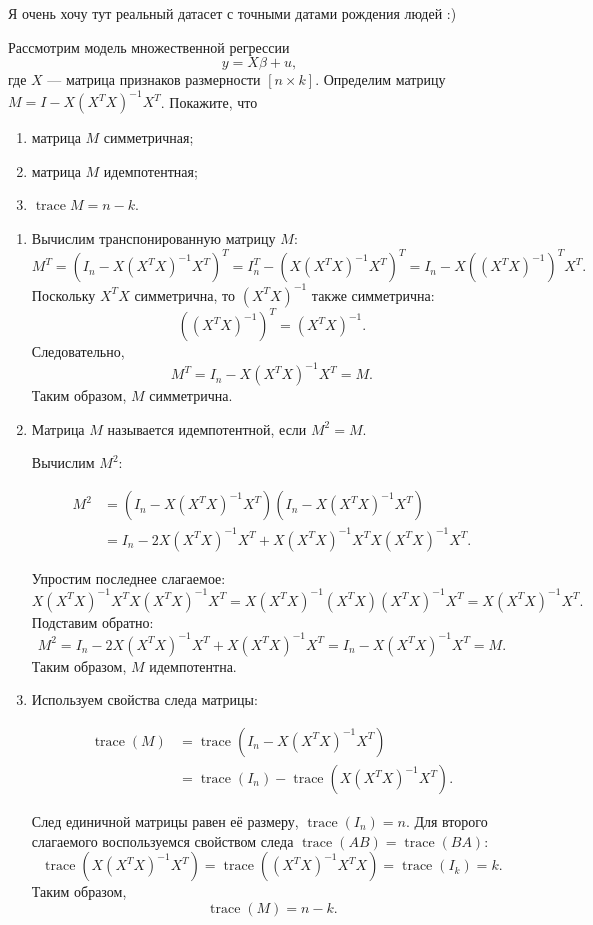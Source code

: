 \documentclass[12pt]{article}
\DeclareMathOperator{\trace}{trace}
\begin{document}
\begin{problem}
    Я очень хочу тут реальный датасет с точными датами рождения людей :)
\end{problem}

\begin{problem}
    Рассмотрим модель множественной регрессии
    \[
    y = X\beta + u,
    \]
    где $X$ — матрица признаков размерности $[n \times k]$.
    Определим матрицу $M = I - X(X^TX)^{-1}X^T$. Покажите, что
    \begin{enumerate}
    \item матрица $M$ симметричная;
    \item матрица $M$ идемпотентная;
    \item $\trace M = n - k$.
    \end{enumerate}
\end{problem}

\begin{sol}
   \begin{enumerate}
\item Вычислим транспонированную матрицу $M$:
\[
M^T = \left(I_n - X(X^T X)^{-1}X^T\right)^T = I_n^T - \left(X(X^T X)^{-1}X^T\right)^T = I_n - X\left((X^T X)^{-1}\right)^T X^T.
\]
Поскольку \( X^T X \) симметрична, то \( (X^T X)^{-1} \) также симметрична:
\[
\left((X^T X)^{-1}\right)^T = (X^T X)^{-1}.
\]
Следовательно,
\[
M^T = I_n - X(X^T X)^{-1}X^T = M.
\]
Таким образом, \( M \) симметрична.

\item Матрица $M$ называется идемпотентной, если $M^2 = M$.

Вычислим $M^2$:

\begin{align}
M^2 &= \left(I_n - X(X^T X)^{-1}X^T\right)\left(I_n - X(X^T X)^{-1}X^T\right) \\
&= I_n - 2X(X^T X)^{-1}X^T + X(X^T X)^{-1}X^T X(X^T X)^{-1}X^T.
\end{align}

Упростим последнее слагаемое:
\[
X(X^T X)^{-1}X^T X(X^T X)^{-1}X^T = X(X^T X)^{-1}(X^T X)(X^T X)^{-1}X^T = X(X^T X)^{-1}X^T.
\]
Подставим обратно:
\[
M^2 = I_n - 2X(X^T X)^{-1}X^T + X(X^T X)^{-1}X^T = I_n - X(X^T X)^{-1}X^T = M.
\]
Таким образом, $M$ идемпотентна.

\item Используем свойства следа матрицы:

\begin{align}
    \trace(M) &= \trace\left(I_n - X(X^T X)^{-1}X^T\right) \\
&= \trace(I_n) - \trace\left(X(X^T X)^{-1}X^T\right).
\end{align}


След единичной матрицы равен её размеру, $\trace(I_n) = n$. 
Для второго слагаемого воспользуемся свойством следа \( \trace(AB) = \trace(BA) \):
\[
\trace\left(X(X^T X)^{-1}X^T\right) = \trace\left((X^T X)^{-1}X^T X\right) = \trace(I_k) = k.
\]
Таким образом,
\[
\trace (M) = n - k.
\]
   \end{enumerate}
\end{sol}
\end{document}
